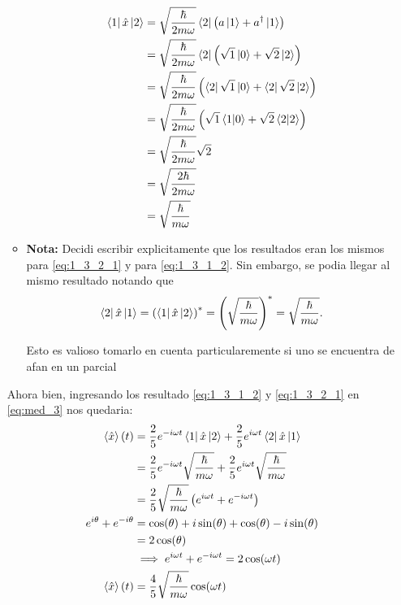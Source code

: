 \documentclass[12pt]{exam}
\begin{document}
\begin{enumerate}
\begin{itemize}
				\begin{align}
					\left<1\right|\hat{x}\left|2\right> &= \sqrt{\frac{\hbar}{2m\omega}}\left<2\right|\left(a\left|1\right> + a^{\dagger}\left|1\right>\right)\nonumber\\
					&= \sqrt{\frac{\hbar}{2m\omega}}\left<2\right|\left(\sqrt{1}\left|0\right> + \sqrt{2}\left|2\right>\right)\nonumber\\
					&= \sqrt{\frac{\hbar}{2m\omega}}\left(\left<2\right|\sqrt{1}\left|0\right> + \left<2\right|\sqrt{2}\left|2\right>\right)\nonumber\\
					&= \sqrt{\frac{\hbar}{2m\omega}}\left(\sqrt{1}\left<1|0\right> + \sqrt{2}\left<2|2\right>\right)\nonumber\\
					&= \sqrt{\frac{\hbar}{2m\omega}}\sqrt{2}\nonumber\\
					&= \sqrt{\frac{2\hbar}{2m\omega}}\nonumber\\
					&= \sqrt{\frac{\hbar}{m\omega}}\label{eq:1_3_2_1}
				\end{align}
			\item \textbf{Nota:}
				Decidi escribir explicitamente que los resultados eran los mismos para \ref{eq:1_3_2_1} y para \ref{eq:1_3_1_2}. Sin embargo, se podia llegar al mismo resultado notando que
				\[\left<2\right|\hat{x}\left|1\right> = \left(\left<1\right|\hat{x}\left|2\right>\right)^{*} = \left(\sqrt{\frac{\hbar}{m\omega}}\right)^* = \sqrt{\frac{\hbar}{m\omega}}.\]

				Esto es valioso tomarlo en cuenta particularemente si uno se encuentra de afan en un parcial
		\end{itemize}

		Ahora bien, ingresando los resultado \ref{eq:1_3_1_2} y \ref{eq:1_3_2_1} en \ref{eq:med_3} nos quedaria:
		\begin{align*}
			\left<\hat{x}\right>(t)&=
			\frac{2}{5}e^{-i\omega t}\left<1\right|\hat{x}\left|2\right> +
			\frac{2}{5}e^{i\omega t}\left<2\right|\hat{x}\left|1\right>\\
			&=
			\frac{2}{5}e^{-i\omega t}\sqrt{\frac{\hbar}{m\omega}} +
			\frac{2}{5}e^{i\omega t}\sqrt{\frac{\hbar}{m\omega}}\\
			&=
			\frac{2}{5}\sqrt{\frac{\hbar}{m\omega}} \left(e^{i\omega t} + e^{-i\omega t}\right)\\
			e^{i\theta} + e^{-i\theta} &= \cos(\theta) + i\sin(\theta) + \cos(\theta) - i\sin(\theta)\\
			&= 2\cos(\theta)\\
			&\implies e^{i\omega t} + e^{-i\omega t} = 2\cos(\omega t)\\
			\left<\hat{x}\right>(t)
			&=
			\frac{4}{5}\sqrt{\frac{\hbar}{m\omega}} \cos(\omega t)\\
		\end{align*}
\end{enumerate}
\break
\end{document}
